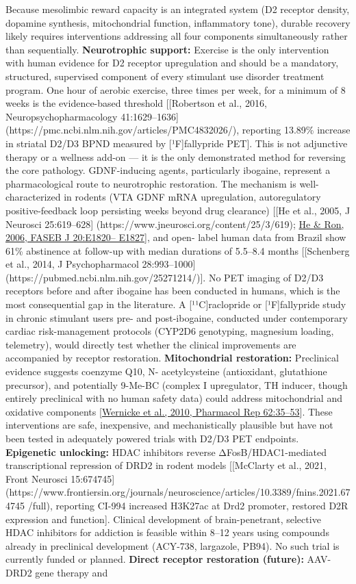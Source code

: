 Because mesolimbic reward capacity is an integrated system (D2 receptor density, dopamine synthesis, mitochondrial function, inflammatory tone), durable recovery likely requires interventions addressing all four components simultaneously rather than sequentially. \textbf{Neurotrophic support:} Exercise is the only intervention with human evidence for D2 receptor upregulation and should be a mandatory, structured, supervised component of every stimulant use disorder treatment program. One hour of aerobic exercise, three times per week, for a minimum of 8 weeks is the evidence-based threshold {[}{[}Robertson et al., 2016, Neuropsychopharmacology 41:1629--1636{]} (https://pmc.ncbi.nlm.nih.gov/articles/PMC4832026/), reporting 13.89\% increase in striatal D2/D3 BPND measured by {[}¹F{]}fallypride PET{]}. This is not adjunctive therapy or a wellness add-on --- it is the only demonstrated method for reversing the core pathology. GDNF-inducing agents, particularly ibogaine, represent a pharmacological route to neurotrophic restoration. The mechanism is well-characterized in rodents (VTA GDNF mRNA upregulation, autoregulatory positive-feedback loop persisting weeks beyond drug clearance) {[}{[}He et al., 2005, J Neurosci 25:619--628{]} (https://www.jneurosci.org/content/25/3/619); \href{https://faseb.onlinelibrary.wiley.com/doi/10.1096/fj.06-6394fje}{He \& Ron, 2006, FASEB J 20:E1820-- E1827}{]}, and open- label human data from Brazil show 61\% abstinence at follow-up with median durations of 5.5--8.4 months {[}{[}Schenberg et al., 2014, J Psychopharmacol 28:993--1000{]} (https://pubmed.ncbi.nlm.nih.gov/25271214/){]}. No PET imaging of D2/D3 receptors before and after ibogaine has been conducted in humans, which is the most consequential gap in the literature. A {[}¹¹C{]}raclopride or {[}¹F{]}fallypride study in chronic stimulant users pre- and post-ibogaine, conducted under contemporary cardiac risk-management protocols (CYP2D6 genotyping, magnesium loading, telemetry), would directly test whether the clinical improvements are accompanied by receptor restoration. \textbf{Mitochondrial restoration:} Preclinical evidence suggests coenzyme Q10, N- acetylcysteine (antioxidant, glutathione precursor), and potentially 9-Me-BC (complex I upregulator, TH inducer, though entirely preclinical with no human safety data) could address mitochondrial and oxidative components {[}\href{https://pubmed.ncbi.nlm.nih.gov/20360614/}{Wernicke et al., 2010, Pharmacol Rep 62:35--53}{]}. These interventions are safe, inexpensive, and mechanistically plausible but have not been tested in adequately powered trials with D2/D3 PET endpoints. \textbf{Epigenetic unlocking:} HDAC inhibitors reverse ΔFosB/HDAC1-mediated transcriptional repression of DRD2 in rodent models {[}{[}McClarty et al., 2021, Front Neurosci 15:674745{]} (https://www.frontiersin.org/journals/neuroscience/articles/10.3389/fnins.2021.674745 /full), reporting CI-994 increased H3K27ac at Drd2 promoter, restored D2R expression and function{]}. Clinical development of brain-penetrant, selective HDAC inhibitors for addiction is feasible within 8--12 years using compounds already in preclinical development (ACY-738, largazole, PB94). No such trial is currently funded or planned. \textbf{Direct receptor restoration (future):} AAV-DRD2 gene therapy and 